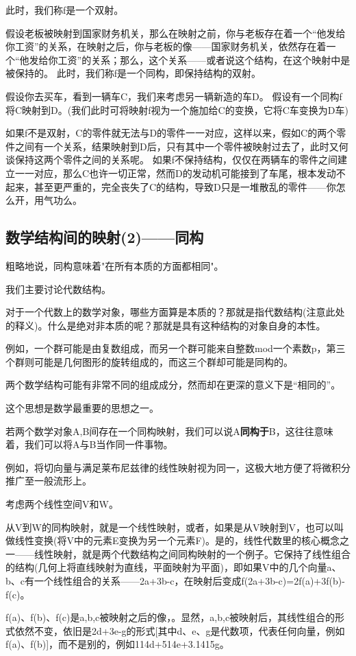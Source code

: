 此时，我们称f是一个双射。

假设老板被映射到国家财务机关，那么在映射之前，你与老板存在着一个“他发给你工资”的关系，在映射之后，你与老板的像——国家财务机关，依然存在着一个“他发给你工资”的关系；那么，这个关系——或者说这个结构，在这个映射中是被保持的。
此时，我们称f是一个同构，即保持结构的双射。

假设你去买车，看到一辆车C，我们来考虑另一辆新造的车D。
假设有一个同构f将C映射到D。(我们此时可将映射f视为一个施加给C的变换，它将C车变换为D车)

如果f不是双射，C的零件就无法与D的零件一一对应，这样以来，假如C的两个零件之间有一个关系，结果映射到D后，只有其中一个零件被映射过去了，此时又何谈保持这两个零件之间的关系呢。
如果f不保持结构，仅仅在两辆车的零件之间建立一一对应，那么C也许一切正常，然而D的发动机可能接到了车尾，根本发动不起来，甚至更严重的，完全丧失了C的结构，导致D只是一堆散乱的零件——你怎么开，用气功么。

\subsection{数学结构间的映射(2)——同构}
粗略地说，同构意味着"在所有本质的方面都相同"。

我们主要讨论代数结构。

对于一个代数上的数学对象，哪些方面算是本质的？那就是指代数结构(注意此处的释义)。什么是绝对非本质的呢？那就是具有这种结构的对象自身的本性。

例如，一个群可能是由复数组成，而另一个群可能来自整数mod一个素数p，第三个群则可能是几何图形的旋转组成的，而这三个群却可能是同构的。

两个数学结构可能有非常不同的组成成分，然而却在更深的意义下是“相同的”。

这个思想是数学最重要的思想之一。

若两个数学对象A,B间存在一个同构映射，我们可以说A\textbf{同构于}B，这往往意味着，我们可以将A与B当作同一件事物。

例如，将切向量与满足莱布尼兹律的线性映射视为同一，这极大地方便了将微积分推广至一般流形上。

考虑两个线性空间V和W。

从V到W的同构映射，就是一个线性映射，或者，如果是从V映射到V，也可以叫做线性变换(将V中的元素E变换为另一个元素F)。是的，线性代数里的核心概念之一——线性映射，就是两个代数结构之间同构映射的一个例子。它保持了线性组合的结构(几何上将直线映射为直线，平面映射为平面)，即如果V中的几个向量a、b、c有一个线性组合的关系——2a+3b-c，在映射后变成f(2a+3b-c)=2f(a)+3f(b)-f(c)。

f(a)、f(b)、f(c)是a,b,c被映射之后的像，。显然，a,b,c被映射后，其线性组合的形式依然不变，依旧是2d+3e-g的形式[其中d、e、g是代数项，代表任何向量，例如f(a)、f(b)]，而不是别的，例如114d+514e+3.1415g。
